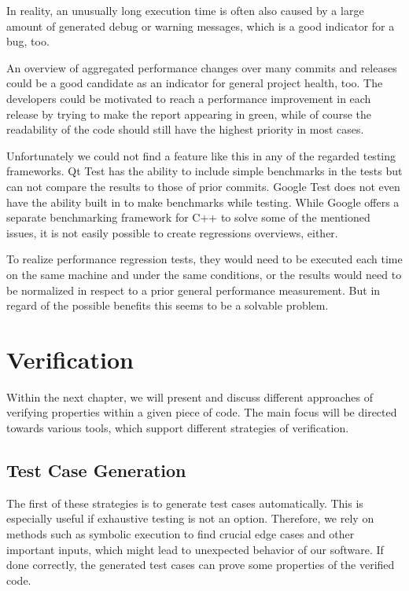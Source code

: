 \documentclass{scrreprt}
\begin{document}
In reality, an unusually long execution time is often also caused by a large amount of generated debug or warning messages, which is a good indicator for a bug, too.

An overview of aggregated performance changes over many commits and releases could be a good candidate as an indicator for general project health, too. The developers could be motivated to reach a performance improvement in each release by trying to make the report appearing in green, while of course the readability of the code should still have the highest priority in most cases.

Unfortunately we could not find a feature like this in any of the regarded testing frameworks. Qt Test has the ability to include simple benchmarks in the tests but can not compare the results to those of prior commits. Google Test does not even have the ability built in to make benchmarks while testing. While Google offers a separate benchmarking framework for C++ to solve some of the mentioned issues, it is not easily possible to create regressions overviews, either.

To realize performance regression tests, they would need to be executed each time on the same machine and under the same conditions, or the results would need to be normalized in respect to a prior general performance measurement. But in regard of the possible benefits this seems to be a solvable problem.


\chapter{Verification}

Within the next chapter, we will present and discuss different approaches of verifying properties within a given piece of code. The main focus will be directed towards various tools, which support different strategies of verification.

\section{Test Case Generation}

The first of these strategies is to generate test cases automatically. This is especially useful if exhaustive testing is not an option. Therefore, we rely on methods such as symbolic execution to find crucial edge cases and other important inputs, which might lead to unexpected behavior of our software. If done correctly, the generated test cases can prove some properties of the verified code.
\end{document}
